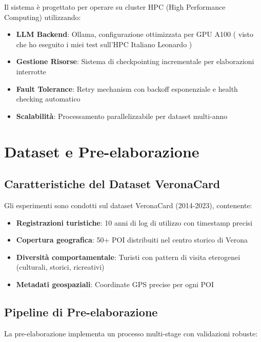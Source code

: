 Il sistema è progettato per operare su cluster HPC (High Performance Computing) utilizzando:
\begin{itemize}
\item \textbf{LLM Backend}: Ollama, configurazione ottimizzata per GPU A100 ( visto che ho eseguito i miei test sull'HPC Italiano Leonardo )
\item \textbf{Gestione Risorse}: Sistema di checkpointing incrementale per elaborazioni interrotte
\item \textbf{Fault Tolerance}: Retry mechanism con backoff esponenziale e health checking automatico
\item \textbf{Scalabilità}: Processamento parallelizzabile per dataset multi-anno
\end{itemize}

\section{Dataset e Pre-elaborazione}

\subsection{Caratteristiche del Dataset VeronaCard}

Gli esperimenti sono condotti sul dataset VeronaCard (2014-2023), contenente:
\begin{itemize}
\item \textbf{Registrazioni turistiche}: 10 anni di log di utilizzo con timestamp precisi
\item \textbf{Copertura geografica}: 50+ POI distribuiti nel centro storico di Verona
\item \textbf{Diversità comportamentale}: Turisti con pattern di visita eterogenei (culturali, storici, ricreativi)
\item \textbf{Metadati geospaziali}: Coordinate GPS precise per ogni POI
\end{itemize}

\subsection{Pipeline di Pre-elaborazione}

La pre-elaborazione implementa un processo multi-stage con validazioni robuste:

